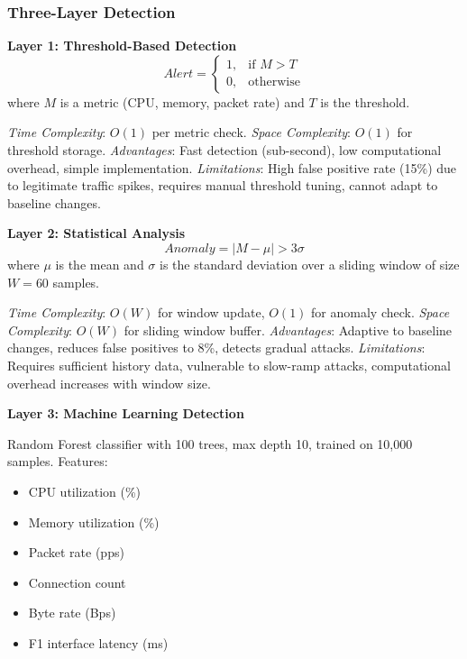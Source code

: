 \documentclass[conference]{IEEEtran}
\begin{document}
\subsubsection{Three-Layer Detection}

\textbf{Layer 1: Threshold-Based Detection}
\begin{equation}
    Alert = \begin{cases}
        1, & \text{if } M > T \\
        0, & \text{otherwise}
    \end{cases}
\end{equation}
where $M$ is a metric (CPU, memory, packet rate) and $T$ is the threshold.

\textit{Time Complexity}: $O(1)$ per metric check. \textit{Space Complexity}: $O(1)$ for threshold storage. \textit{Advantages}: Fast detection (sub-second), low computational overhead, simple implementation. \textit{Limitations}: High false positive rate (15\%) due to legitimate traffic spikes, requires manual threshold tuning, cannot adapt to baseline changes.

\textbf{Layer 2: Statistical Analysis}
\begin{equation}
    Anomaly = |M - \mu| > 3\sigma
\end{equation}
where $\mu$ is the mean and $\sigma$ is the standard deviation over a sliding window of size $W=60$ samples.

\textit{Time Complexity}: $O(W)$ for window update, $O(1)$ for anomaly check. \textit{Space Complexity}: $O(W)$ for sliding window buffer. \textit{Advantages}: Adaptive to baseline changes, reduces false positives to 8\%, detects gradual attacks. \textit{Limitations}: Requires sufficient history data, vulnerable to slow-ramp attacks, computational overhead increases with window size.

\textbf{Layer 3: Machine Learning Detection}

Random Forest classifier with 100 trees, max depth 10, trained on 10,000 samples. Features:
\begin{itemize}
    \item CPU utilization (\%)
    \item Memory utilization (\%)
    \item Packet rate (pps)
    \item Connection count
    \item Byte rate (Bps)
    \item F1 interface latency (ms)
\end{itemize}
\end{document}
